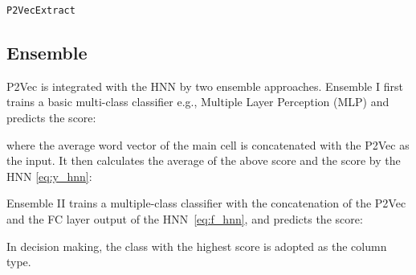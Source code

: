 \documentclass{article}
\begin{document}
\begin{algorithm}[h!]
\small
{} 
\Return{}
\caption{ 
\label{alg:prop_vec} 
\small{\tt{P2VecExtract} }
}

\end{algorithm}

\subsection{Ensemble}
P2Vec is integrated with the HNN by two ensemble approaches.
Ensemble I first trains a basic multi-class classifier e.g., Multiple Layer Perception (MLP) and predicts the score:

where the average word vector of the main cell  is concatenated with the P2Vec  as the input.
It then calculates the average of the above score and the score by the HNN \eqref{eq:y_hnn}: 
\vspace{-0.1cm}


Ensemble II trains a multiple-class classifier with the concatenation of the P2Vec  and the FC layer output of the HNN~\eqref{eq:f_hnn},
and predicts the score: 

In decision making, the class with the highest score is adopted as the column type.
\end{document}
